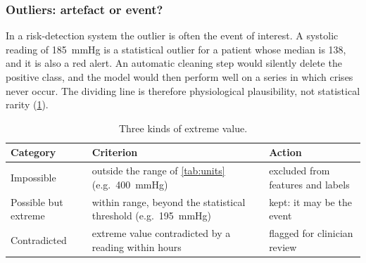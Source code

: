 \subsubsection{Outliers: artefact or event?}\label{sec:outliers}\label{sec:mad-shrinkage}

In a risk-detection system the outlier is often the event of interest. A systolic reading of 185~mmHg is a statistical outlier for a patient whose median is 138, and it is also a red alert. An automatic cleaning step would silently delete the positive class, and the model would then perform well on a series in which crises never occur. The dividing line is therefore physiological plausibility, not statistical rarity (\cref{tab:outlier-categories}).

\begin{table}[htbp]
\centering\footnotesize
\caption{Three kinds of extreme value.}\label{tab:outlier-categories}
\begin{tabularx}{\textwidth}{@{}>{\raggedright\arraybackslash}p{3.4cm} X >{\raggedright\arraybackslash}p{4.2cm}@{}}
\toprule
\textbf{Category} & \textbf{Criterion} & \textbf{Action} \\
\midrule
Impossible & outside the range of \cref{tab:units} (e.g.\ 400~mmHg) & excluded from features and labels \\
Possible but extreme & within range, beyond the statistical threshold (e.g.\ 195~mmHg) & kept: it may be the event \\
Contradicted & extreme value contradicted by a reading within hours & flagged for clinician review \\
\bottomrule
\end{tabularx}
\end{table}

